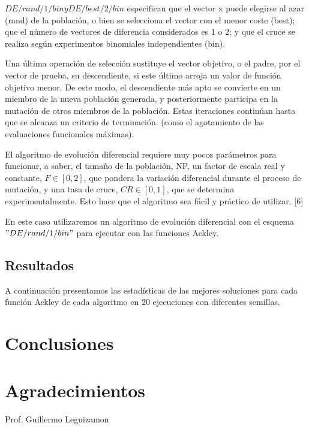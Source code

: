 \documentclass[10pt]{article}
\begin{document}
$ DE/rand/1/bin y DE/best/2/bin $ especifican que el vector x puede elegirse al azar (rand) de la población, o bien se selecciona el vector con el menor coste (best); que el número de vectores de diferencia considerados es 1 o 2; y que el cruce se realiza según experimentos binomiales independientes (bin).

Una última operación de selección sustituye el vector objetivo, o el padre, por el vector de prueba, su descendiente, si este último arroja un valor de función objetivo menor. De este modo, el descendiente más apto se convierte en un miembro de la nueva población generada, y posteriormente participa en la mutación de otros miembros de la población. Estas iteraciones continúan hasta que se alcanza un criterio de terminación. (como el agotamiento de las evaluaciones funcionales máximas).

El algoritmo de evolución diferencial requiere muy pocos parámetros para funcionar, a saber, el tamaño de la población, NP, un factor de escala real y constante, $F \in [0, 2] $, que pondera la variación diferencial durante el proceso de mutación, y una tasa de cruce, $ CR \in  [0, 1]$, que se determina experimentalmente. Esto hace que el algoritmo sea fácil y práctico de utilizar. [6]

En este caso utilizaremos un algoritmo de evolución diferencial con el esquema $ " DE/rand/1/bin " $ para ejecutar con las funciones Ackley.

\subsection{Resultados}%
A continuación presentamos las estadísticas de las mejores soluciones para cada función Ackley de cada algoritmo en 20 ejecuciones con diferentes semillas.

\section{Conclusiones}

\section*{Agradecimientos}
Prof. Guillermo Leguizamon

\end{document}

